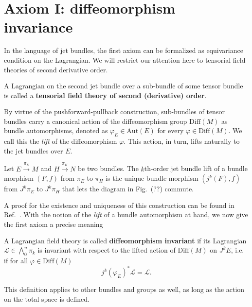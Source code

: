 \section{Axiom I: diffeomorphism invariance}

In the language of jet bundles, the first axiom can be formalized as equivariance condition on the Lagrangian. We will restrict our attention here to tensorial field theories of second derivative order.

\begin{definition}
  A Lagrangian on the second jet bundle over a sub-bundle of some tensor bundle is called a \textbf{tensorial field theory of second (derivative) order}.
\end{definition}

By virtue of the pushforward-pullback construction, sub-bundles of tensor bundles carry a canonical action of the diffeomorphism group $\mathrm{Diff}(M)$ as bundle automorphisms, denoted as $\varphi_E\in \mathrm{Aut}(E)$ for every $\varphi\in\mathrm{Diff}(M)$. We call this the \emph{lift} of the diffeomorphism $\varphi$. This action, in turn, lifts naturally to the jet bundles over $E$.

\begin{definition}
  Let $E \overset{\pi_E}{\longrightarrow} M$ and $H \overset{\pi_H}{\longrightarrow} N$ be two bundles. The $k$th-order jet bundle lift of a bundle morphism $(F,f)$ from $\pi_E$ to $\pi_H$ is the unique bundle morphism $(j^k(F),f)$ from $J^k\pi_E$ to $J^k\pi_H$ that lets the diagram in Fig.~(??) commute.
\end{definition}
A proof for the existence and uniqueness of this construction can be found in Ref.~\cite{saunders}. With the notion of the \emph{lift} of a bundle automorphism at hand, we now give the first axiom a precise meaning
\begin{definition}
  A Lagrangian field theory is called \textbf{diffeomorphism invariant} if its Lagrangian $\mathcal L\in\textstyle\bigwedge_0^n\pi_k$ is invariant with respect to the lifted action of $\mathrm{Diff}(M)$ on $J^kE$, i.e.~ if for all $\varphi\in\mathrm{Diff}(M)$
  \begin{equation}\label{lagrangian_diffeo_invariance}
    j^k(\varphi_E)^\ast \mathcal L = \mathcal L.
  \end{equation}
\end{definition}
This definition applies to other bundles and groups as well, as long as the action on the total space is defined.


